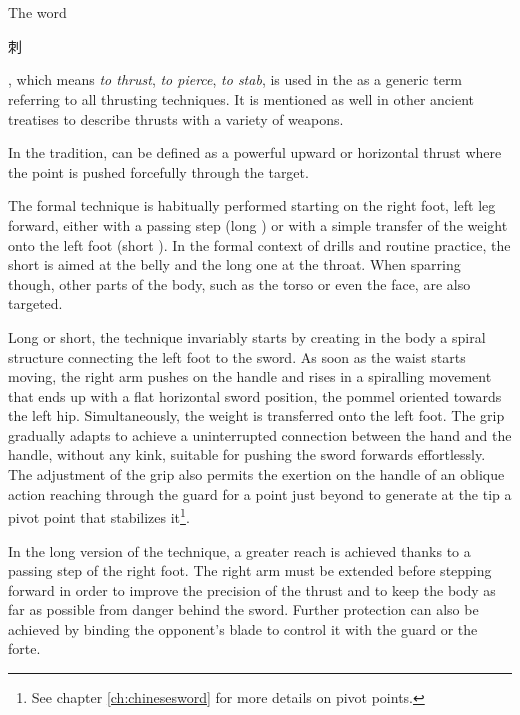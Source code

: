 
\section{\Ci{}}
The word \Ci{} \begin{CJK*}{UTF8}{bsmi}刺\end{CJK*}, which means \textit{to thrust}, \textit{to pierce}, \textit{to stab}, is used in the \WubeiZhi{} as a generic term referring to all thrusting techniques. It is mentioned as well in other ancient treatises to describe thrusts with a variety of weapons.

In the \Yangjia{} \Michuan{} tradition, \Ci{} can be defined as a powerful upward or horizontal thrust where the point is pushed forcefully through the target. 

The formal technique is habitually performed starting on the right foot, left leg forward, either with a passing step (long \Ci{}) or with a simple transfer of the weight onto the left foot (short \Ci{}). In the formal context of drills and routine practice, the short \Ci{} is aimed at the belly and the long one at the throat. When sparring though, other parts of the body, such as the torso or even the face, are also targeted.

Long or short, the technique invariably starts by creating in the body a spiral structure connecting the left foot to the sword. As soon as the waist starts moving, the right arm pushes on the handle and rises in a spiralling movement that ends up with a flat horizontal sword position, the pommel oriented towards the left hip. Simultaneously, the weight is transferred onto the left foot. The grip gradually adapts to achieve a uninterrupted connection between the hand and the handle, without any kink, suitable for pushing the sword forwards effortlessly. The adjustment of the grip also permits the exertion on the handle of an oblique action reaching through the guard for a point just beyond to generate at the tip a pivot point that stabilizes it\footnote{See chapter \ref*{ch:chinesesword} for more details on pivot points.}. 

In the long version of the technique, a greater reach is achieved thanks to a passing step of the right foot. The right arm must be extended before stepping forward in order to improve the precision of the thrust and to keep the body as far as possible from danger behind the sword. Further protection can also be achieved by binding the opponent's blade to control it with the guard or the forte.

